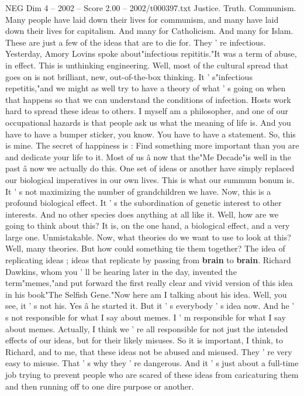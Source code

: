 \begin{textsample}{NEG Dim 4 – 2002 – Score 2.00 – 2002/t000397.txt}
Justice.
Truth.
Communism.
Many people have laid down their lives for communism, and many have laid down their lives for capitalism.
And many for Catholicism.
And many for Islam.
These are just a few of the ideas that are to die for.
They ' re infectious.
Yesterday, Amory Lovins spoke about"infectious repititis."It was a term of abuse, in effect.
This is unthinking engineering.
Well, most of the cultural spread that goes on is not brilliant, new, out-of-the-box thinking.
It ' s"infectious repetitis,"and we might as well try to have a theory of what ' s going on when that happens so that we can understand the conditions of infection.
Hosts work hard to spread these ideas to others.
I myself am a philosopher, and one of our occupational hazards is that people ask us what the meaning of life is.
And you have to have a bumper sticker, you know.
You have to have a statement.
So, this is mine.
The secret of happiness is : Find something more important than you are and dedicate your life to it.
Most of us â now that the"Me Decade"is well in the past â now we actually do this.
One set of ideas or another have simply replaced our biological imperatives in our own lives.
This is what our summum bonum is.
It ' s not maximizing the number of grandchildren we have.
Now, this is a profound biological effect.
It ' s the subordination of genetic interest to other interests.
And no other species does anything at all like it.
Well, how are we going to think about this?
It is, on the one hand, a biological effect, and a very large one.
Unmistakable.
Now, what theories do we want to use to look at this?
Well, many theories.
But how could something tie them together?
The idea of replicating ideas ; ideas that replicate by passing from \textbf{brain} to \textbf{brain}.
Richard Dawkins, whom you ' ll be hearing later in the day, invented the term"memes,"and put forward the first really clear and vivid version of this idea in his book"The Selfish Gene."Now here am I talking about his idea.
Well, you see, it ' s not his.
Yes â he started it.
But it ' s everybody ' s idea now.
And he ' s not responsible for what I say about memes.
I ' m responsible for what I say about memes.
Actually, I think we ' re all responsible for not just the intended effects of our ideas, but for their likely misuses.
So it is important, I think, to Richard, and to me, that these ideas not be abused and misused.
They ' re very easy to misuse.
That ' s why they ' re dangerous.
And it ' s just about a full-time job trying to prevent people who are scared of these ideas from caricaturing them and then running off to one dire purpose or another.

\end{textsample}
